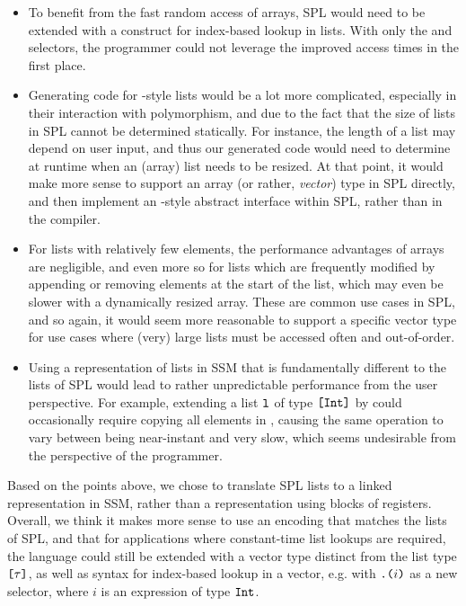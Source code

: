 \begin{itemize}
  \item To benefit from the fast random access of arrays, SPL would need to be
        extended with a construct for index-based lookup in lists. With only the
         and  selectors, the programmer could not leverage the
        improved access times in the first place.
  \item Generating code for -style lists would be a lot more
        complicated, especially in their interaction with polymorphism, and due
        to the fact that the size of lists in SPL cannot be determined
        statically. For instance, the length of a list may depend on user input,
        and thus our generated code would need to determine at runtime when an
        (array) list needs to be resized. At that point, it would make more
        sense to support an array (or rather, \emph{vector}) type in SPL
        directly, and then implement an -style abstract
        interface within SPL, rather than in the compiler.
  \item For lists with relatively few elements, the performance advantages of
        arrays are negligible, and even more so for lists which are frequently
        modified by appending or removing elements at the start of the list,
        which may even be slower with a dynamically resized array.
        These are common use cases in SPL, and so again, it would seem more
        reasonable to support a specific vector type for use cases where (very)
        large lists must be accessed often and out-of-order.
  \item Using a representation of lists in SSM that is fundamentally different
        to the lists of SPL would lead to rather unpredictable performance from
        the user perspective. For example, extending a list
        $\texttt{l}$ of type $\texttt{[}\texttt{Int}\texttt{]}$ by  could occasionally
        require copying all elements in , causing the same operation to
        vary between being near-instant and very slow, which seems undesirable
        from the perspective of the programmer.
\end{itemize}

Based on the points above, we chose to translate SPL lists to a linked
representation in SSM, rather than a representation using blocks of registers.
Overall, we think it makes more sense to use an encoding that matches the lists
of SPL, and that for applications where constant-time list lookups are required,
the language could still be extended with a vector type distinct from the list
type $\texttt{[}\tau\texttt{]}$, as well as syntax for index-based lookup in a vector, e.g.
with $\texttt{.(}i\texttt{)}$ as a new selector, where $i$ is an expression of type
$\texttt{Int}$.


